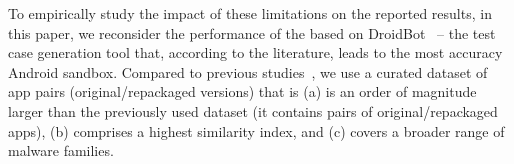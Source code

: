 
To empirically study the impact of these limitations on the reported results, in this paper, we reconsider the performance of the \mas based on DroidBot~\cite{DBLP:conf/icse/LiYGC17} -- the test case generation tool that, according to the literature, leads to the most accuracy Android sandbox. 
Compared to previous studies~\cite{DBLP:conf/wcre/BaoLL18,DBLP:conf/scam/CostaMCMVBC20},
we use a curated dataset of app pairs (original/repackaged versions) that is 
(a) is an order of magnitude larger than the previously used dataset (it contains \apps pairs of original/repackaged apps), 
(b) comprises a highest similarity index, and 
(c) covers a broader range of malware families. 
 
